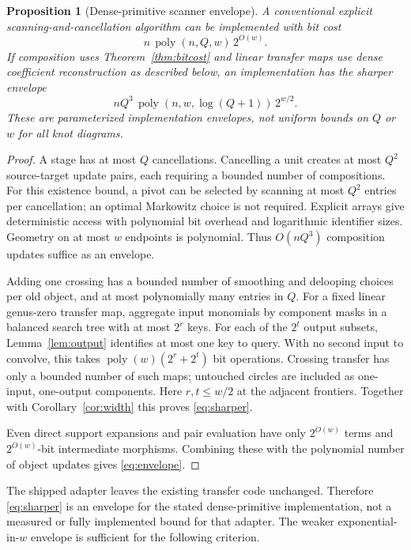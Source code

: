\documentclass[11pt,letterpaper]{article}
\newtheorem{proposition}[theorem]{Proposition}
\theoremstyle{definition}
\theoremstyle{remark}
\newcommand{\poly}{\operatorname{poly}}
\begin{document}
\begin{proposition}[Dense-primitive scanner envelope]
\label{prop:scanner}
A conventional explicit scanning-and-cancellation algorithm can be
implemented with bit cost
\begin{equation}
 n\,\poly(n,Q,w)\,2^{O(w)}.
 \label{eq:envelope}
\end{equation}
If composition uses Theorem~\ref{thm:bitcost} and linear transfer maps use
dense coefficient reconstruction as described below, an implementation has
the sharper envelope
\begin{equation}
 n Q^3\,\poly(n,w,\log(Q+1))\,2^{w/2}.
 \label{eq:sharper}
\end{equation}
These are parameterized implementation envelopes, not uniform bounds on
$Q$ or $w$ for all knot diagrams.
\end{proposition}
\begin{proof}
A stage has at most $Q$ cancellations. Cancelling a unit creates at most
$Q^2$ source-target update pairs, each requiring a bounded number of
compositions. For this existence bound, a pivot can be selected by scanning at most
$Q^2$ entries per cancellation; an optimal Markowitz choice is not required.
Explicit arrays give deterministic access with polynomial bit overhead
and logarithmic identifier sizes. Geometry on at most $w$ endpoints is
polynomial. Thus $O(nQ^3)$ composition updates suffice as an envelope.

Adding one crossing has a bounded number of smoothing and delooping
choices per old object, and at most polynomially many entries in $Q$.
For a fixed linear genus-zero transfer map, aggregate input monomials by
component masks in a balanced search tree with at most $2^r$ keys. For each of the
$2^t$ output subsets, Lemma~\ref{lem:output} identifies at most one key
to query. With no second input to convolve, this takes
$\poly(w)(2^r+2^t)$ bit operations. Crossing transfer has only a bounded
number of such maps; untouched circles are included as one-input,
one-output components. Here $r,t\leq w/2$ at the adjacent frontiers.
Together with Corollary~\ref{cor:width} this proves \eqref{eq:sharper}.

Even direct support expansions and pair evaluation have only $2^{O(w)}$
terms and $2^{O(w)}$-bit intermediate morphisms. Combining these with the
polynomial number of object updates gives \eqref{eq:envelope}.
\end{proof}

The shipped adapter leaves the existing transfer code unchanged. Therefore
\eqref{eq:sharper} is an envelope for the stated dense-primitive
implementation, not a measured or fully implemented bound for that adapter.
The weaker exponential-in-$w$ envelope is sufficient for the following
criterion.
\end{document}
